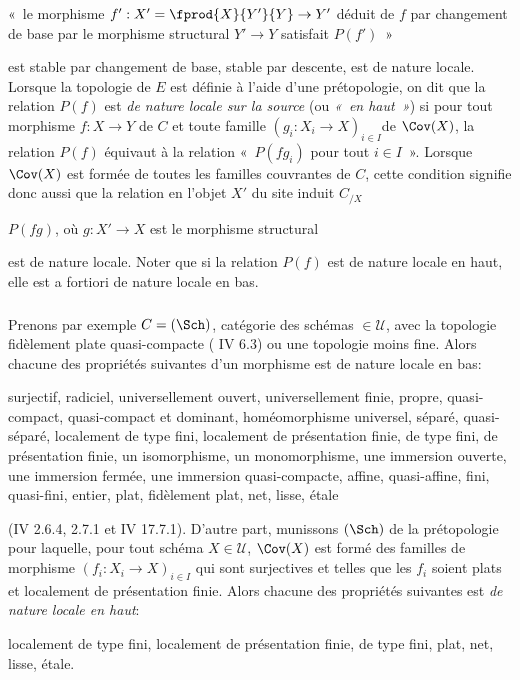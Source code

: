 « le morphisme $f':X'=\fprod{X}{Y'}{Y}\rightarrow Y'$ déduit de
$f$ par changement de base par le morphisme structural
$Y'\rightarrow Y$ satisfait $P(f')$ »

est stable par changement de base, \resp stable par descente, \resp
est de nature locale. Lorsque la topologie de $E$ est définie à
l'aide d'une prétopologie, on dit que la relation $P(f)$ est
\emph{de nature locale sur la source} (ou \emph{« en haut »}) si
pour tout morphisme $f:X\rightarrow Y$ de $C$ et toute famille
$(g_i:X_i\rightarrow X)_{i\in I}$\pageoriginale de $\Cov(X)$, la
relation $P(f)$ équivaut à la relation « $P(fg_i)$ pour tout $i\in
I$ ». Lorsque $\Cov(X)$ est formée de toutes les familles
couvrantes de $C$, cette condition signifie donc aussi que la
relation en l'objet $X'$ du site induit $C_{/X}$
\begin{center}
$P(fg)$, où $g:X'\rightarrow X$ est le morphisme structural
\end{center}
est de nature locale. Noter que si la relation $P(f)$ est de nature
locale en haut, elle est a fortiori de nature locale en bas.

\subsubsection{}
Prenons par exemple $C=(\Sch)$, catégorie des schémas $\in
𝒰$, avec la topologie fidèlement plate quasi-compacte ( IV 6.3) ou une topologie moins fine. Alors chacune des propriétés
suivantes d'un morphisme est de nature locale en bas:

surjectif, radiciel, universellement ouvert, universellement finie,
propre, quasi-compact, quasi-compact et dominant, homéomorphisme
universel, séparé, quasi-séparé, localement de type fini, localement
de présentation finie, de type fini, de présentation finie, un
isomorphisme, un monomorphisme, une immersion ouverte, une immersion
fermée, une immersion quasi-compacte, affine, quasi-affine, fini,
quasi-fini, entier, plat, fidèlement plat, net, lisse, étale

\noindent (\EGA IV 2.6.4, 2.7.1 et \EGA IV 17.7.1). D'autre part,
munissons $(\Sch)$ de la prétopologie pour laquelle, pour tout
schéma $X\in 𝒰$, $\Cov(X)$ est formé des familles de
morphisme $(f_i:X_i\rightarrow X)_{i\in I}$ qui sont surjectives et
telles que les $f_i$ soient plats et localement de présentation
finie. Alors chacune des propriétés suivantes est \emph{de nature
locale en haut}:

localement de type fini, localement de présentation finie, de type
fini, plat, net, lisse, étale.

